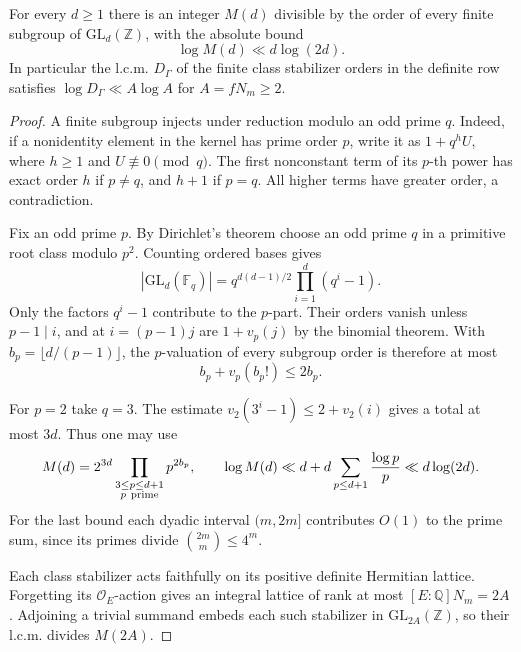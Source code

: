 \begin{auxlemma}
\label{lem:uniform-stabilizer-denominator}
For every \(d\ge1\) there is an integer \(M(d)\) divisible by the
order of every finite subgroup of \(\mathrm{GL}_d(\mathbb Z)\), with the absolute bound
\[
                    \log M(d)\ll d\log(2d).
\] In particular
the l.c.m. \(D_\Gamma\) of the finite class stabilizer orders in the
definite row satisfies \(\log D_\Gamma\ll A\log A\) for \(A=fN_m\ge2\).
\end{auxlemma}
\begin{proof}
A finite subgroup injects under reduction modulo an odd prime \(q\).
Indeed, if a nonidentity element in the kernel has prime order \(p\),
write it as \(1+q^h U\), where \(h\ge1\) and \(U\not\equiv0\pmod q\).
The first nonconstant term of its \(p\)-th power has exact order
\(h\) if \(p\ne q\), and \(h+1\) if \(p=q\). All higher terms
have greater order, a contradiction.

Fix an odd prime \(p\). By Dirichlet's theorem choose an odd prime
\(q\) in a primitive root class modulo \(p^2\). Counting ordered bases gives
\[
       |\mathrm{GL}_d(\mathbb F_q)|=q^{d(d-1)/2}\prod_{i=1}^d(q^i-1).
\]
Only the factors \(q^i-1\) contribute to the \(p\)-part. Their orders vanish
unless \(p-1\mid i\), and at \(i=(p-1)j\) are \(1+v_p(j)\) by the
binomial theorem. With \(b_p=\lfloor d/(p-1)\rfloor\), the
\(p\)-valuation of every subgroup order is therefore at most
\[
    b_p+v_p(b_p!)\le 2b_p .
\]

For \(p=2\) take \(q=3\). The estimate
\(v_2(3^i-1)\le2+v_2(i)\) gives a total at most \(3d\).
Thus one may use
\[
 M(d)=2^{3d}\prod_{\substack{3\le p\le d+1\\p\ {\rm prime}}}p^{2b_p},
 \qquad \log M(d)\ll d+d\sum_{p\le d+1}\frac{\log p}{p}
                   \ll d\log(2d).
\]
For the last bound each dyadic interval \((m,2m]\) contributes
\(O(1)\) to the prime sum, since its primes divide
\(\binom{2m}{m}\le4^m\).

Each class stabilizer acts faithfully on its positive definite
Hermitian lattice. Forgetting its \(\mathcal O_E\)-action gives
an integral lattice of rank at most \([E:\mathbb Q]N_m=2A\).
Adjoining a trivial summand embeds each such stabilizer in
\(\mathrm{GL}_{2A}(\mathbb Z)\), so their l.c.m. divides \(M(2A)\).
\end{proof}

